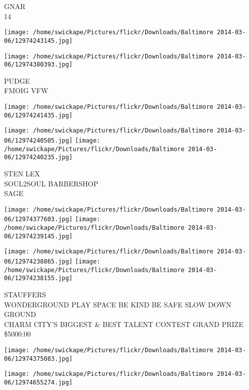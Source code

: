 \documentclass[10pt,letterpaper]{article}
\begin{document}
GNAR\\
14\\
\pagebreak

\texttt{[image: /home/swickape/Pictures/flickr/Downloads/Baltimore 2014-03-06/12974243145.jpg]}

\vspace{0.25in}
\texttt{[image: /home/swickape/Pictures/flickr/Downloads/Baltimore 2014-03-06/12974380393.jpg]}

PUDGE\\
FMOIG VFW\\
\pagebreak

\texttt{[image: /home/swickape/Pictures/flickr/Downloads/Baltimore 2014-03-06/12974241435.jpg]}

\vspace{0.25in}
\texttt{[image: /home/swickape/Pictures/flickr/Downloads/Baltimore 2014-03-06/12974240505.jpg]}
\texttt{[image: /home/swickape/Pictures/flickr/Downloads/Baltimore 2014-03-06/12974240235.jpg]}

STEN LEX\\
SOUL2SOUL BARBERSHOP\\
SAGE\\
\pagebreak

\texttt{[image: /home/swickape/Pictures/flickr/Downloads/Baltimore 2014-03-06/12974377603.jpg]}
\texttt{[image: /home/swickape/Pictures/flickr/Downloads/Baltimore 2014-03-06/12974239145.jpg]}

\texttt{[image: /home/swickape/Pictures/flickr/Downloads/Baltimore 2014-03-06/12974238865.jpg]}
\texttt{[image: /home/swickape/Pictures/flickr/Downloads/Baltimore 2014-03-06/12974238155.jpg]}

STAUFFERS\\
WONDERGROUND PLAY SPACE BE KIND BE SAFE SLOW DOWN\\
GROUND\\
CHARM CITY'S BIGGEST \& BEST TALENT CONTEST GRAND PRIZE \$5000.00\\
\pagebreak

\texttt{[image: /home/swickape/Pictures/flickr/Downloads/Baltimore 2014-03-06/12974375083.jpg]}

\vspace{0.25in}
\texttt{[image: /home/swickape/Pictures/flickr/Downloads/Baltimore 2014-03-06/12974655274.jpg]}
\end{document}
